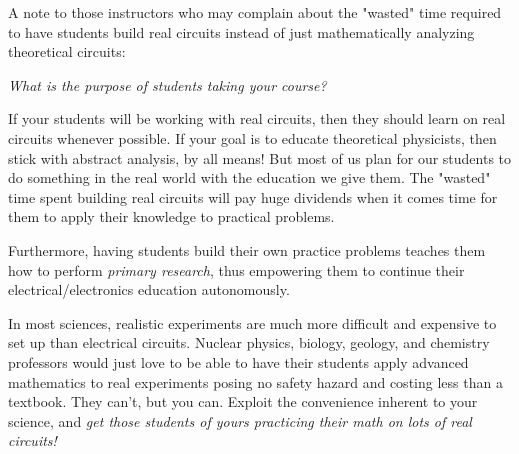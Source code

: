\vskip 10pt

A note to those instructors who may complain about the "wasted" time required to have students build real circuits instead of just mathematically analyzing theoretical circuits:

\vskip 10pt

\hskip 1in
{\it What is the purpose of students taking your course?}

\vskip 10pt

If your students will be working with real circuits, then they should learn on real circuits whenever possible.  If your goal is to educate theoretical physicists, then stick with abstract analysis, by all means!  But most of us plan for our students to do something in the real world with the education we give them.  The "wasted" time spent building real circuits will pay huge dividends when it comes time for them to apply their knowledge to practical problems.

Furthermore, having students build their own practice problems teaches them how to perform {\it primary research}, thus empowering them to continue their electrical/electronics education autonomously.

In most sciences, realistic experiments are much more difficult and expensive to set up than electrical circuits.  Nuclear physics, biology, geology, and chemistry professors would just love to be able to have their students apply advanced mathematics to real experiments posing no safety hazard and costing less than a textbook.  They can't, but you can.  Exploit the convenience inherent to your science, and {\it get those students of yours practicing their math on lots of real circuits!}





